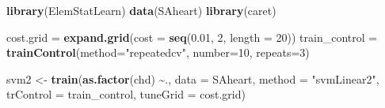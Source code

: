 \documentclass[
]{book}
\newenvironment{Shaded}{\begin{snugshade}}{\end{snugshade}}
\newcommand{\AttributeTok}[1]{\textcolor[rgb]{0.13,0.29,0.53}{#1}}
\newcommand{\DecValTok}[1]{\textcolor[rgb]{0.00,0.00,0.81}{#1}}
\newcommand{\FloatTok}[1]{\textcolor[rgb]{0.00,0.00,0.81}{#1}}
\newcommand{\FunctionTok}[1]{\textcolor[rgb]{0.13,0.29,0.53}{\textbf{#1}}}
\newcommand{\NormalTok}[1]{#1}
\newcommand{\OtherTok}[1]{\textcolor[rgb]{0.56,0.35,0.01}{#1}}
\newcommand{\SpecialCharTok}[1]{\textcolor[rgb]{0.81,0.36,0.00}{\textbf{#1}}}
\newcommand{\StringTok}[1]{\textcolor[rgb]{0.31,0.60,0.02}{#1}}
\theoremstyle{definition}
\theoremstyle{definition}
\theoremstyle{definition}
\theoremstyle{definition}
\theoremstyle{remark}
\begin{document}
\begin{Shaded}
\begin{Highlighting}[]
  \FunctionTok{library}\NormalTok{(ElemStatLearn)}
  \FunctionTok{data}\NormalTok{(SAheart)}
  \FunctionTok{library}\NormalTok{(caret)}

\NormalTok{  cost.grid }\OtherTok{=} \FunctionTok{expand.grid}\NormalTok{(}\AttributeTok{cost =} \FunctionTok{seq}\NormalTok{(}\FloatTok{0.01}\NormalTok{, }\DecValTok{2}\NormalTok{, }\AttributeTok{length =} \DecValTok{20}\NormalTok{))}
\NormalTok{  train\_control }\OtherTok{=} \FunctionTok{trainControl}\NormalTok{(}\AttributeTok{method=}\StringTok{"repeatedcv"}\NormalTok{, }\AttributeTok{number=}\DecValTok{10}\NormalTok{, }\AttributeTok{repeats=}\DecValTok{3}\NormalTok{)}
  
\NormalTok{  svm2 }\OtherTok{\textless{}{-}} \FunctionTok{train}\NormalTok{(}\FunctionTok{as.factor}\NormalTok{(chd) }\SpecialCharTok{\textasciitilde{}}\NormalTok{., }\AttributeTok{data =}\NormalTok{ SAheart, }\AttributeTok{method =} \StringTok{"svmLinear2"}\NormalTok{, }
                \AttributeTok{trControl =}\NormalTok{ train\_control,  }
                \AttributeTok{tuneGrid =}\NormalTok{ cost.grid)}
  

\end{Highlighting}
\end{Shaded}
\end{document}
